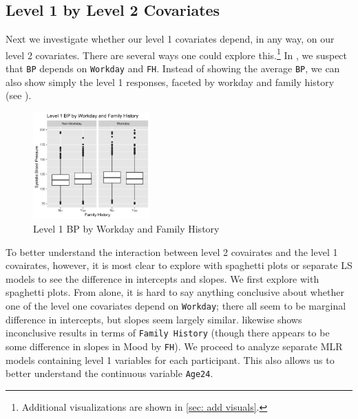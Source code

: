 \documentclass[12pt,twoside,letterpaper]{article}
\theoremstyle{definition}
\theoremstyle{definition}
\begin{document}
\subsection{Level 1 by Level 2 Covariates}\label{sec: lv1 x lv2}

Next we investigate whether our level 1 covariates depend, in any way, on our level 2 covariates. There are several ways one could explore this.\footnote{Additional visualizations are shown in \autoref{sec: add visuals}.} In , we suspect that \texttt{BP} depends on \texttt{Workday} and \texttt{FH}. Instead of showing the average \texttt{BP}, we can also show simply the level 1 responses, faceted by workday and family history (see ).

\begin{figure} 
\centering
\includegraphics[width=0.4\textwidth]{pics/bp by day and fh.png}
\caption{Level 1 BP by Workday and Family History}
\label{fig: bp by day and fh}
\end{figure}

To better understand the interaction between level 2 covairates and the level 1 covairates, however, it is most clear to explore with spaghetti plots or separate LS models to see the difference in intercepts and slopes. We first explore with spaghetti plots. From  alone, it is hard to say anything conclusive about whether one of the level one covariates depend on \texttt{Workday}; there all seem to be marginal difference in intercepts, but slopes seem largely similar.  likewise shows inconclusive results in terms of \texttt{Family History} (though there appears to be some difference in slopes in Mood by \texttt{FH}). We proceed to analyze separate MLR models containing level 1 variables for each participant. This also allows us to better understand the continuous variable \texttt{Age24}. 
\end{document}
